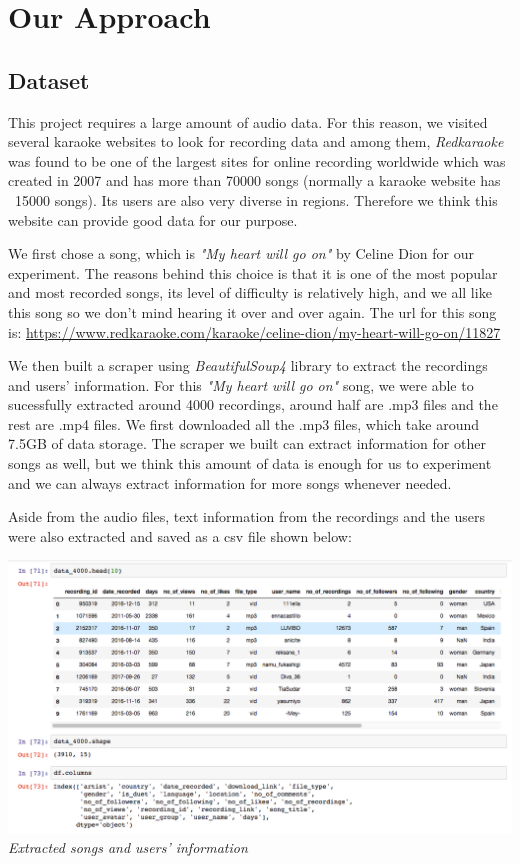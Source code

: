 \documentclass[paper=a4, fontsize=11pt, DIV=13]{scrartcl}
\begin{document}
\section{Our Approach}

\subsection{Dataset}
This project requires a large amount of audio data. For this reason, we visited several karaoke websites to look for recording data and among them, \textit{Redkaraoke} was found to be one of the largest sites for online recording worldwide which was created in 2007 and has more than 70000 songs (normally a karaoke website has ~15000 songs). Its users are also very diverse in regions. Therefore we think this website can provide good data for our purpose. 

We first chose a song, which is \textit{"My heart will go on"} by Celine Dion for our experiment. The reasons behind this choice is that it is one of the most popular and most recorded songs, its level of difficulty is relatively high, and we all like this song so we don't mind hearing it over and over again. The url for this song is:  \url{https://www.redkaraoke.com/karaoke/celine-dion/my-heart-will-go-on/11827}

We then built a scraper using \textit{BeautifulSoup4} library to extract the recordings and users' information. For this \textit{"My heart will go on"} song, we were able to sucessfully extracted around  4000 recordings, around half are .mp3 files and the rest are .mp4 files. We first downloaded all the .mp3 files, which take around 7.5GB of data storage. The scraper we built can extract information for other songs as well, but we think this amount of data is enough for us to experiment and we can always extract information for more songs whenever needed.

Aside from the audio files, text information from the recordings and the users were also extracted and saved as a csv file shown below:
 
 \begin{center}
\includegraphics[scale=0.4]{img/1.png}\\
\textit{Extracted songs and users' information}\\
\end{center}
\end{document}
